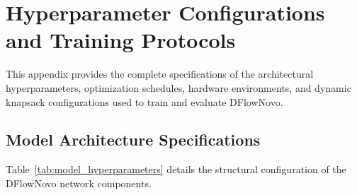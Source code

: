 \chapter{Hyperparameter Configurations and Training Protocols}

This appendix provides the complete specifications of the architectural hyperparameters, optimization schedules, hardware environments, and dynamic knapsack configurations used to train and evaluate DFlowNovo.

\section{Model Architecture Specifications}

Table~\ref{tab:model_hyperparameters} details the structural configuration of the DFlowNovo network components.

